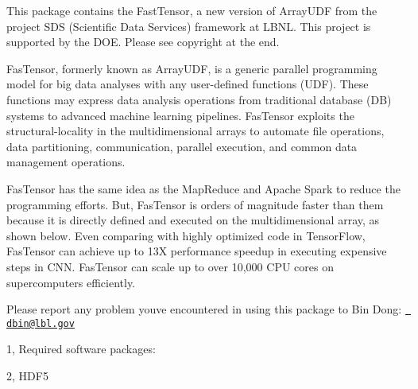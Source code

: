 \label{index_md_README}%
%
 This package contains the Fast\+Tensor, a new version of Array\+UDF from the project SDS (Scientific Data Services) framework at LBNL. This project is supported by the DOE. Please see copyright at the end.

Fas\+Tensor, formerly known as Array\+UDF, is a generic parallel programming model for big data analyses with any user-\/defined functions (UDF). These functions may express data analysis operations from traditional database (DB) systems to advanced machine learning pipelines. Fas\+Tensor exploits the structural-\/locality in the multidimensional arrays to automate file operations, data partitioning, communication, parallel execution, and common data management operations.

Fas\+Tensor has the same idea as the Map\+Reduce and Apache Spark to reduce the programming efforts. But, Fas\+Tensor is orders of magnitude faster than them because it is directly defined and executed on the multidimensional array, as shown below. Even comparing with highly optimized code in Tensor\+Flow, Fas\+Tensor can achieve up to 13X performance speedup in executing expensive steps in CNN. Fas\+Tensor can scale up to over 10,000 CPU cores on supercomputers efficiently.

Please report any problem you\textquotesingle{}ve encountered in using this package to Bin Dong\+: \href{mailto:dbin@lbl.gov}{\texttt{ dbin@lbl.\+gov}}

1, Required software packages\+:


\begin{DoxyCode}{0}
\DoxyCodeLine{    }
\DoxyCodeLine{}

\end{DoxyCode}


2, HDF5


